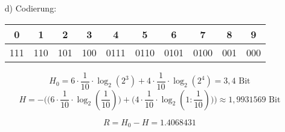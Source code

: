 \documentclass[a4paper,10pt]{scrartcl}
\begin{document}
\begin{enumerate}
\begin{enumerate}
            \item[d)]
            	Codierung: \\
                \begin{tabular}{c|c|c|c|c|c|c|c|c|c}
                    0 & 1 & 2 & 3 & 4 & 5 & 6 & 7 & 8 & 9 \\
                    \hline
                    111 & 110 & 101 & 100 & 0111 & 0110 & 0101 & 0100 & 001 & 000
                \end{tabular}
                 $$H_0 = 6 \cdot \frac{1}{10} \cdot \log_2(2^3) + 4 \cdot \frac{1}{10} \cdot \log_2(2^4) = 3,4 \text{ Bit}$$ 
                  $$H = - \bigg(\big(6 \cdot \frac{1}{10} \cdot \log_2(\frac{1}{10})\big) + \big(4 \cdot \frac{1}{10} \cdot \log_2(1 : \frac{1}{10})\big)\bigg) \approx 1,9931569 \text{ Bit}$$
                  
                  $$R = H_0 - H = 1.4068431$$
        \end{enumerate}
\end{enumerate}
\end{document}
